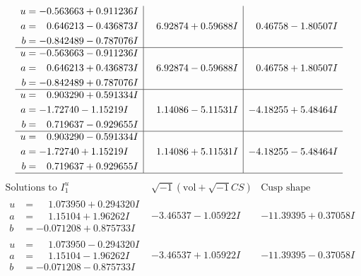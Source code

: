 \documentclass[1p]{elsarticle_modified}
\theoremstyle{definition}
\newcommand{\I}{\sqrt{-1}}
\begin{document}
$$\begin{array}{c|c|c}
\begin{aligned}
u &= -0.563663 + 0.911236 I \\
a &= \phantom{-}0.646213 - 0.436873 I \\
b &= -0.842489 - 0.787076 I\end{aligned}
 & \phantom{-}6.92874 + 0.59688 I & \phantom{-}0.46758 - 1.80507 I \\ \hline\begin{aligned}
u &= -0.563663 - 0.911236 I \\
a &= \phantom{-}0.646213 + 0.436873 I \\
b &= -0.842489 + 0.787076 I\end{aligned}
 & \phantom{-}6.92874 - 0.59688 I & \phantom{-}0.46758 + 1.80507 I \\ \hline\begin{aligned}
u &= \phantom{-}0.903290 + 0.591334 I \\
a &= -1.72740 - 1.15219 I \\
b &= \phantom{-}0.719637 - 0.929655 I\end{aligned}
 & \phantom{-}1.14086 - 5.11531 I & -4.18255 + 5.48464 I \\ \hline\begin{aligned}
u &= \phantom{-}0.903290 - 0.591334 I \\
a &= -1.72740 + 1.15219 I \\
b &= \phantom{-}0.719637 + 0.929655 I\end{aligned}
 & \phantom{-}1.14086 + 5.11531 I & -4.18255 - 5.48464 I\\
 \hline 
 \end{array}$$\newpage$$\begin{array}{c|c|c}  
\text{Solutions to }I^u_{1}& \I (\text{vol} + \sqrt{-1}CS) & \text{Cusp shape}\\
 \hline 
\begin{aligned}
u &= \phantom{-}1.073950 + 0.294320 I \\
a &= \phantom{-}1.15104 + 1.96262 I \\
b &= -0.071208 + 0.875733 I\end{aligned}
 & -3.46537 - 1.05922 I & -11.39395 + 0.37058 I \\ \hline\begin{aligned}
u &= \phantom{-}1.073950 - 0.294320 I \\
a &= \phantom{-}1.15104 - 1.96262 I \\
b &= -0.071208 - 0.875733 I\end{aligned}
 & -3.46537 + 1.05922 I & -11.39395 - 0.37058 I \\ \hline\begin{aligned}

\end{aligned}
\end{array}$$
\end{document}
